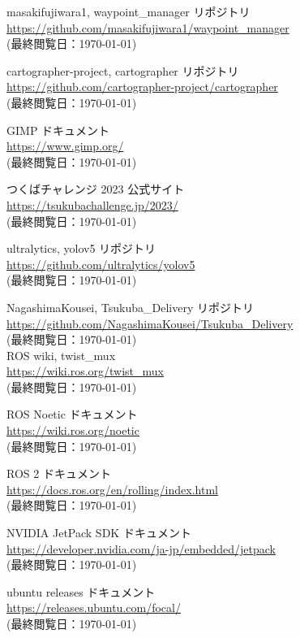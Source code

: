 \documentclass[twocolumn, 9pt]{jsproceedings}
\begin{document}
\begin{thebibliography}{99}
masakifujiwara1, waypoint\_manager リポジトリ\\
\url{https://github.com/masakifujiwara1/waypoint_manager}\\
(最終閲覧日：\today)

cartographer-project, cartographer リポジトリ\\
\url{https://github.com/cartographer-project/cartographer}\\
(最終閲覧日：\today)

GIMP ドキュメント\\
\url{https://www.gimp.org/}\\
(最終閲覧日：\today)

つくばチャレンジ 2023 公式サイト\\
\url{https://tsukubachallenge.jp/2023/}\\
(最終閲覧日：\today)

ultralytics, yolov5 リポジトリ\\
\url{https://github.com/ultralytics/yolov5}\\
(最終閲覧日：\today)

NagashimaKousei, Tsukuba\_Delivery リポジトリ\\
\url{https://github.com/NagashimaKousei/Tsukuba_Delivery}\\
(最終閲覧日：\today)\\

ROS wiki, twist\_mux\\
\url{https://wiki.ros.org/twist_mux}\\
(最終閲覧日：\today)

ROS Noetic ドキュメント\\
\url{https://wiki.ros.org/noetic}\\
(最終閲覧日：\today)

ROS 2 ドキュメント\\
\url{https://docs.ros.org/en/rolling/index.html}\\
(最終閲覧日：\today)

NVIDIA JetPack SDK ドキュメント\\
\url{https://developer.nvidia.com/ja-jp/embedded/jetpack}\\
(最終閲覧日：\today)

ubuntu releases ドキュメント\\
\url{https://releases.ubuntu.com/focal/}\\
(最終閲覧日：\today)


\end{thebibliography}
\end{document}
